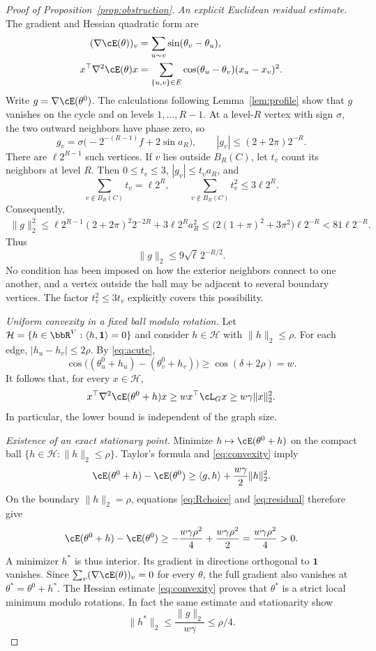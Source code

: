 \documentclass[11pt,reqno]{amsart}
\begin{document}
\begin{proof}[Proof of Proposition~\ref{prop:obstruction}]
\smallskip
\emph{An explicit Euclidean residual estimate.}
The gradient and Hessian quadratic form are
\begin{align*}
 (\nabla\cE(\theta))_v
   &=\sum_{u\sim v}\sin(\theta_v-\theta_u),\\
 x^{\top}\nabla^2\cE(\theta)x
   &=\sum_{\{u,v\}\in E}\cos(\theta_u-\theta_v)(x_u-x_v)^2.
\end{align*}
Write $g=\nabla\cE(\theta^0)$. The calculations following Lemma~\ref{lem:profile} show that $g$ vanishes on the cycle and on levels $1,\ldots,R-1$. At a level-$R$ vertex with sign $\sigma$, the two outward neighbors have phase zero, so
\[
 g_v=\sigma\bigl(-2^{-(R-1)}f+2\sin a_R\bigr),
 \qquad |g_v|\le(2+2\pi)2^{-R}.
\]
There are $\ell2^{R-1}$ such vertices. If $v$ lies outside $B_R(C)$, let $t_v$ count its neighbors at level $R$. Then $0\le t_v\le3$, $|g_v|\le t_va_R$, and
\[
 \sum_{v\notin B_R(C)}t_v=\ell2^R,\qquad
 \sum_{v\notin B_R(C)}t_v^2\le3\ell2^R.
\]
Consequently,
\begin{align*}
 \|g\|_2^2
 \le \ell2^{R-1}(2+2\pi)^2 2^{-2R}
       +3\ell2^R a_R^2 \le \bigl(2(1+\pi)^2+3\pi^2\bigr)\ell2^{-R}
 <81\ell2^{-R}.
\end{align*}
Thus
\begin{equation}\label{eq:residual}
 \|g\|_2\le9\sqrt\ell\,2^{-R/2}.
\end{equation}
No condition has been imposed on how the exterior neighbors connect to one another, and a vertex outside the ball may be adjacent to several boundary vertices. The factor $t_v^2\le3t_v$ explicitly covers this possibility.

\smallskip
\emph{Uniform convexity in a fixed ball modulo rotation.}
Let $\mathcal H=\{h\in\bbR^V:\langle h,\mathbf 1\rangle=0\}$ and consider $h\in\mathcal H$ with $\|h\|_2\le\rho$. For each edge, $|h_u-h_v|\le2\rho$. By \eqref{eq:acute},
\[
 \cos\bigl((\theta^0_u+h_u)-(\theta^0_v+h_v)\bigr)
 \ge\cos(\delta+2\rho)=w.
\]
It follows that, for every $x\in\mathcal H$,
\begin{equation}\label{eq:convexity}
 x^{\top}\nabla^2\cE(\theta^0+h)x
 \ge w x^{\top}\cL_Gx
 \ge w\gamma\|x\|_2^2.
\end{equation}
In particular, the lower bound is independent of the graph size.

\smallskip
\emph{Existence of an exact stationary point.}
Minimize $h\mapsto\cE(\theta^0+h)$ on the compact ball
$\{h\in\mathcal H:\|h\|_2\le\rho\}$. Taylor's formula and \eqref{eq:convexity} imply
\[
 \cE(\theta^0+h)-\cE(\theta^0)
 \ge \langle g,h\rangle+\frac{w\gamma}{2}\|h\|_2^2.
\]
On the boundary $\|h\|_2=\rho$, equations \eqref{eq:Rchoice} and \eqref{eq:residual} therefore give
\[
 \cE(\theta^0+h)-\cE(\theta^0)
 \ge -\frac{w\gamma\rho^2}{4}
        +\frac{w\gamma\rho^2}{2}
 =\frac{w\gamma\rho^2}{4}>0.
\]
A minimizer $h^*$ is thus interior. Its gradient in directions orthogonal to $\mathbf 1$ vanishes. Since $\sum_v(\nabla\cE(\theta))_v=0$ for every $\theta$, the full gradient also vanishes at $\theta^*=\theta^0+h^*$. The Hessian estimate \eqref{eq:convexity} proves that $\theta^*$ is a strict local minimum modulo rotations. In fact the same estimate and stationarity show
\[
 \|h^*\|_2\le\frac{\|g\|_2}{w\gamma}\le\rho/4.
\]


\end{proof}
\end{document}
